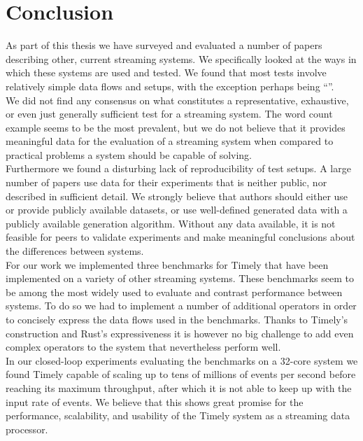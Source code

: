 \section{Conclusion}
As part of this thesis we have surveyed and evaluated a number of papers describing other, current streaming systems. We specifically looked at the ways in which these systems are used and tested. We found that most tests involve relatively simple data flows and setups, with the exception perhaps being ``''\cite{storm2}. \\

We did not find any consensus on what constitutes a representative, exhaustive, or even just generally sufficient test for a streaming system. The word count example seems to be the most prevalent, but we do not believe that it provides meaningful data for the evaluation of a streaming system when compared to practical problems a system should be capable of solving. \\

Furthermore we found a disturbing lack of reproducibility of test setups. A large number of papers use data for their experiments that is neither public, nor described in sufficient detail. We strongly believe that authors should either use or provide publicly available datasets, or use well-defined generated data with a publicly available generation algorithm. Without any data available, it is not feasible for peers to validate experiments and make meaningful conclusions about the differences between systems. \\

For our work we implemented three benchmarks for Timely that have been implemented on a variety of other streaming systems. These benchmarks seem to be among the most widely used to evaluate and contrast performance between systems. To do so we had to implement a number of additional operators in order to concisely express the data flows used in the benchmarks. Thanks to Timely's construction and Rust's expressiveness it is however no big challenge to add even complex operators to the system that nevertheless perform well. \\

In our closed-loop experiments evaluating the benchmarks on a 32-core system we found Timely capable of scaling up to tens of millions of events per second before reaching its maximum throughput, after which it is not able to keep up with the input rate of events. We believe that this shows great promise for the performance, scalability, and usability of the Timely system as a streaming data processor. \\

